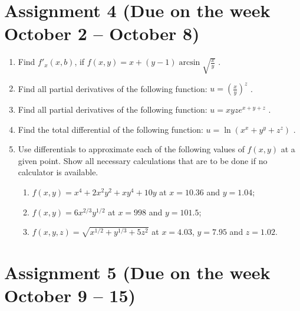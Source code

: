 \documentclass[12pt]{article} %
\theoremstyle{definition} %
\begin{document}
\section{Assignment 4 (Due on the week October 2 – October 8)}

\begin{enumerate}

\item Find $f'_x(x,b)$, if $f(x,y)= x+(y-1)\arcsin \sqrt{\frac xy}$ .

\item Find all partial derivatives of the following function: $u=\left(\frac xy\right)^z$ .

\item Find all partial derivatives of the following function: $u=xyz e^{x+y+z}$ .

\item Find the total differential of the following function: $u=\ln (x^x+y^y+z^z)$ .

\item Use differentials to approximate each of the following values of $f(x,y)$ at a given point. Show all necessary calculations that are to be done if no calculator is available.
\begin{enumerate}
\item $f(x,y)=x^4+2x^2y^2+xy^4+10y$ at $x=10.36$ and $y=1.04$;
\item $f(x,y)=6x^{2/3}y^{1/2}$  at $x=998$ and $y=101.5$;
\item $f(x,y,z)=\sqrt{x^{1/2}+y^{1/3}+5z^2}$ at $x=4.03$, $y=7.95$ and $z=1.02$.
\end{enumerate}
\end{enumerate}



\section{Assignment 5 (Due on the week October 9 – 15)}
\end{document}
